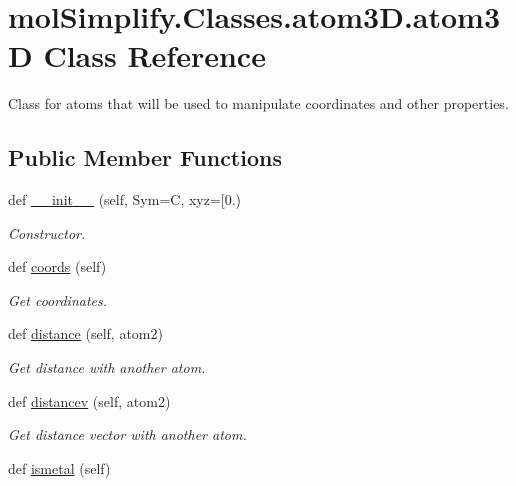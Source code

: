 \hypertarget{classmolSimplify_1_1Classes_1_1atom3D_1_1atom3D}{}\section{mol\+Simplify.\+Classes.\+atom3\+D.\+atom3D Class Reference}
\label{classmolSimplify_1_1Classes_1_1atom3D_1_1atom3D}


Class for atoms that will be used to manipulate coordinates and other properties.  


\subsection*{Public Member Functions}
\begin{DoxyCompactItemize}
\item 
def \hyperlink{classmolSimplify_1_1Classes_1_1atom3D_1_1atom3D_a4b6ec2f6f500e6d9337921a1738b78ab}{\+\_\+\+\_\+init\+\_\+\+\_\+} (self, Sym=\textquotesingle{}C\textquotesingle{}, xyz=\mbox{[}0.)
\begin{DoxyCompactList}\small\item\em Constructor. \end{DoxyCompactList}\item 
def \hyperlink{classmolSimplify_1_1Classes_1_1atom3D_1_1atom3D_a0bb2c02700429e2e3c5c4371ee75f1ec}{coords} (self)
\begin{DoxyCompactList}\small\item\em Get coordinates. \end{DoxyCompactList}\item 
def \hyperlink{classmolSimplify_1_1Classes_1_1atom3D_1_1atom3D_a0d5567e58ee8b779ba24bb53a596ef0d}{distance} (self, atom2)
\begin{DoxyCompactList}\small\item\em Get distance with another atom. \end{DoxyCompactList}\item 
def \hyperlink{classmolSimplify_1_1Classes_1_1atom3D_1_1atom3D_a32e06fac98f2835db82a3a265495481f}{distancev} (self, atom2)
\begin{DoxyCompactList}\small\item\em Get distance vector with another atom. \end{DoxyCompactList}\item 
def \hyperlink{classmolSimplify_1_1Classes_1_1atom3D_1_1atom3D_a5e99710890819b9533a7701d64f1512c}{ismetal} (self)

\end{DoxyCompactItemize}
